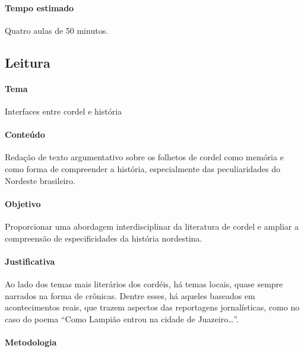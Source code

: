 \documentclass[12pt]{extarticle}
\begin{document}
\paragraph{Tempo estimado} Quatro aulas de 50 minutos.

\subsection{Leitura}

\paragraph{Tema} Interfaces entre cordel e história

\paragraph{Conteúdo} Redação de texto argumentativo sobre os folhetos de cordel
como memória e como forma de compreender a história, especialmente das
peculiaridades do Nordeste brasileiro.

\paragraph{Objetivo} Proporcionar uma abordagem interdisciplinar da literatura
de cordel e ampliar a compreensão de especificidades da história nordestina.

\paragraph{Justificativa} Ao lado dos temas mais literários dos cordéis, há
temas locais, quase sempre narrados na forma de crônicas. Dentre esses, há
aqueles baseados em acontecimentos reais, que trazem aspectos das reportagens
jornalísticas, como no caso do poema ``Como Lampião entrou na cidade de
Juazeiro{}\dots{}''.

\paragraph{Metodologia}
\end{document}
